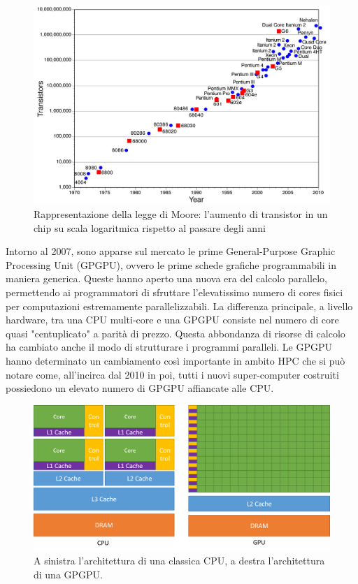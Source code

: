 \documentclass[12pt,a4paper]{book} %
\begin{document}
	\begin{figure}[!ht]
		\centering
		\includegraphics[width=0.7\linewidth]{Moores_Law}
		\caption[Legge di Moore]{Rappresentazione della legge di Moore: l'aumento di transistor in un chip su scala logaritmica rispetto al passare degli anni}
		\label{fig:mooreslaw}
	\end{figure}
	
	Intorno al 2007, sono apparse sul mercato le prime General-Purpose Graphic Processing Unit (GPGPU), ovvero le prime schede grafiche programmabili in maniera generica. Queste hanno aperto una nuova era del calcolo parallelo, permettendo ai programmatori di sfruttare l'elevatissimo numero di cores fisici per computazioni estremamente parallelizzabili. La differenza principale, a livello hardware, tra una CPU multi-core e una GPGPU consiste nel numero di core quasi "centuplicato" a parità di prezzo. Questa abbondanza di risorse di calcolo ha cambiato anche il modo di strutturare i programmi paralleli. Le GPGPU hanno determinato un cambiamento così importante in ambito HPC che si può notare come, all'incirca dal 2010 in poi, tutti i nuovi super-computer costruiti possiedono un elevato numero di GPGPU affiancate alle CPU.
	
	\begin{figure}[!ht]
		\centering
		\includegraphics[width=0.7\linewidth]{cpu-gpu-computing-architecture}
		\caption[Differenza architetturale tra CPU e GPU]{A sinistra l'architettura di una classica CPU, a destra l'architettura di una GPGPU.}
		\label{fig:cpu-gpu-computing-architecture}
	\end{figure}
	
\end{document}
